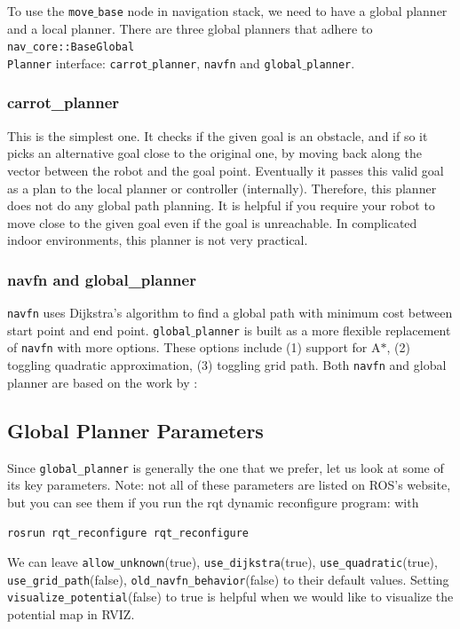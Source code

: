 \documentclass[12pt]{article}
\begin{document}
To use the \texttt{move$\_$base} node in navigation stack, we need to have a global planner
and a local planner. There are three global planners that adhere to \texttt{nav\_core::BaseGlobal\\Planner} interface: \texttt{carrot$\_$planner},
\texttt{navfn} and \texttt{global$\_$planner}.

\subsubsection{carrot\_planner}

This is the simplest one. It checks if the given goal is an obstacle, and if so it picks an alternative goal close to the original one, by moving back along the vector between the robot and the goal point. Eventually it passes this valid goal as a plan to the local planner or controller (internally). Therefore, this planner does not do any global path planning. It is helpful if you require your robot to move close to the given goal even if the goal is unreachable. In complicated indoor environments, this planner is not very practical.

\subsubsection{navfn and global\_planner}

\texttt{navfn} uses Dijkstra's algorithm to find a global path with minimum cost between start point and
end point. \texttt{global$\_$planner} is built as a more flexible replacement of \texttt{navfn} with more options. These
options include (1) support for A$*$, (2) toggling quadratic approximation, (3) toggling grid path. Both \texttt{navfn} and
global planner are based on the work by \cite{brock1999high}:

\subsection{Global Planner Parameters}
\normalsize

Since \texttt{global\_planner} is generally the one that we prefer, let us look at some of its key parameters.
Note: not all of these parameters are listed on ROS's website, but you can see them if you run the rqt dynamic reconfigure program: with \begin{center}
\texttt{rosrun rqt\_reconfigure rqt\_reconfigure}
\end{center}

We can leave \texttt{allow\_unknown}(true), \texttt{use\_dijkstra}(true), \texttt{use\_quadratic}(true), \texttt{use\_grid\_path}(false), \texttt{old\_navfn\_behavior}(false) to
their default values. Setting \texttt{visualize\_potential}(false) to true is helpful when we would like to visualize the potential map in RVIZ.
\end{document}
